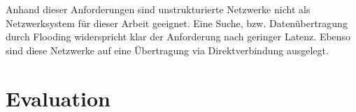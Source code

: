 Anhand dieser Anforderungen sind unstrukturierte Netzwerke nicht als Netzwerksystem für dieser Arbeit geeignet. Eine Suche, bzw. Datenübertragung durch Flooding widerspricht klar der Anforderung nach geringer Latenz. Ebenso sind diese Netzwerke auf eine Übertragung via Direktverbindung ausgelegt.




\section{Evaluation}


\cite{Lua2005} %

\cite{Castro2003Evaluation} %

\cite{Fahmy2007} %

\cite{Rowstron2001} %

\cite{Zhao2004Tapestry} %

\cite{Malkhi2002Viceroy} %

\cite{Bo2003PeertoPeer}
